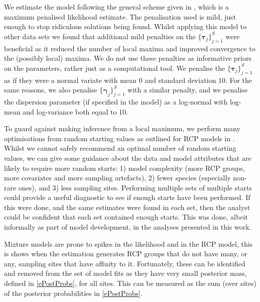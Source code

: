 \documentclass{statsoc}
\newcommand{\vg}{\bm{\gamma}}
\newcommand{\vt}{\bm{\tau}}
\begin{document}
We estimate the model following the general scheme given in \citet{fos13}, which is a maximum penalised likelihood estimate. The penalisation used is mild, just enough to stop ridiculous solutions being found. Whilst applying this model to other data sets \citep[see][]{lyo15} we found that additional mild penalties on the $\{\vt_j\}_{j=1}^S$ were beneficial as it reduced the number of local maxima and improved convergence to the (possibly local) maxima. We do not use these penalties as informative priors on the parameters, rather just as a computational tool. We penalise the $\{\vt_j\}_{j=1}^S$ as if they were a normal variate with mean 0 and standard deviation 10. For the same reasons, we also penalise $\{\vg_j\}_{j=1}^S$ with a similar penalty, and we penalise the dispersion parameter (if specified in the model) as a log-normal with log-mean and log-variance both equal to 10. %

To guard against making inference from a local maximum, we perform many optimisations from random starting values as outlined for RCP models in \citet{fos13}. Whilst we cannot safely recommend an optimal number of random starting values, we can give some guidance about the data and model attributes that are likely to require more random starts: 1) model complexity (more RCP groups, more covariates and more sampling artefacts), 2) fewer species (especially non-rare ones), and 3) less sampling sites. Performing multiple sets of multiple starts could provide a useful diagnostic to see if enough starts have been performed. If this were done, and the same estimates were found in each set, then the analyst could be confident that each set contained enough starts. This was done, albeit informally as part of model development, in the analyses presented in this work.

Mixture models are prone to spikes in the likelihood \citep[eg][]{mcl00} and in the RCP model, this is shows when the estimation generates RCP groups that do not have many, or any, sampling sites that have affinity to it. Fortunately, these can be identified and removed from the set of model fits as they have very small posterior mass, defined in \eqref{ePostProbs}, for all sites. This can be measured as the sum (over sites) of the posterior probabilities in \eqref{ePostProbs}.
\end{document}
